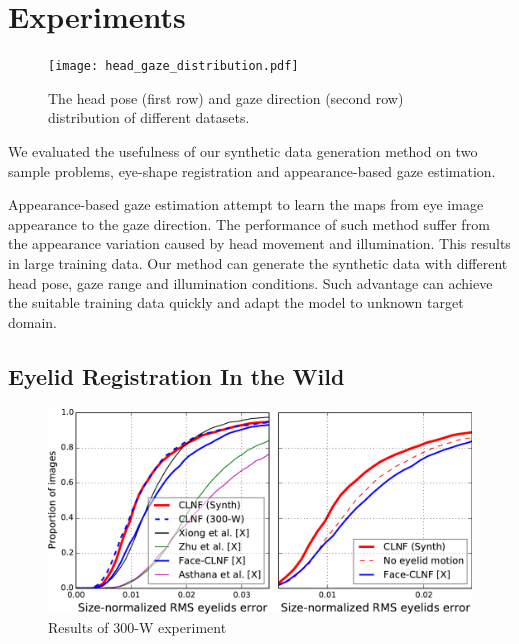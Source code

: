 
\section{Experiments}


\begin{figure}
    \centering
    \texttt{[image: head\_gaze\_distribution.pdf]}
    \caption{The head pose (first row) and gaze direction (second row) distribution of different datasets.}
    \label{fig:head_gaze_distribution}
\end{figure}


% 

We evaluated the usefulness of our synthetic data generation method on two sample problems, eye-shape registration and appearance-based gaze estimation.


Appearance-based gaze estimation attempt to learn the maps from eye image appearance to the gaze direction. The performance of such method suffer from the appearance variation caused by head movement and illumination. This results in large training data. Our method can generate the synthetic data with different head pose, gaze range and illumination conditions. Such advantage can achieve the suitable training data quickly and adapt the model to unknown target domain.

\subsection{Eyelid Registration In the Wild}

\begin{figure}
    \centering
    \includegraphics[width=\columnwidth]{figs/CLNF_300W_experiment.pdf}
    \caption{Results of 300-W experiment}
    \label{fig:clnf_results_wild}
\end{figure}

